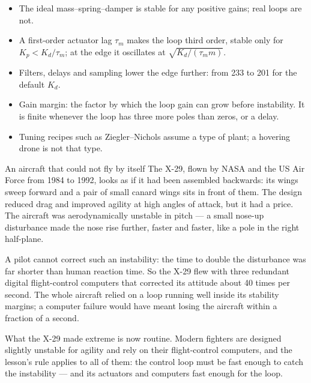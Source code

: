 \begin{remember}
\begin{itemize}
  \item The ideal mass–spring–damper is stable for any positive gains; real loops are not.
  \item A first-order actuator lag $\tau_m$ makes the loop third order, stable only for $K_p < K_d/\tau_m$; at the edge it oscillates at $\sqrt{K_d/(\tau_mm)}$.
  \item Filters, delays and sampling lower the edge further: from 233 to 201 for the default $K_d$.
  \item Gain margin: the factor by which the loop gain can grow before instability. It is finite whenever the loop has three more poles than zeros, or a delay.
  \item Tuning recipes such as Ziegler–Nichols assume a type of plant; a hovering drone is not that type.
\end{itemize}
\end{remember}

\begin{curiosity}{An aircraft that could not fly by itself}
The X-29, flown by NASA and the US Air Force from 1984 to 1992, looks as if it had been assembled backwards: its wings sweep forward and a pair of small canard wings sits in front of them. The design reduced drag and improved agility at high angles of attack, but it had a price. The aircraft was aerodynamically unstable in pitch — a small nose-up disturbance made the nose rise further, faster and faster, like a pole in the right half-plane.

A pilot cannot correct such an instability: the time to double the disturbance was far shorter than human reaction time. So the X-29 flew with three redundant digital flight-control computers that corrected its attitude about 40 times per second. The whole aircraft relied on a loop running well inside its stability margins; a computer failure would have meant losing the aircraft within a fraction of a second.

What the X-29 made extreme is now routine. Modern fighters are designed slightly unstable for agility and rely on their flight-control computers, and the lesson's rule applies to all of them: the control loop must be fast enough to catch the instability — and its actuators and computers fast enough for the loop.
\end{curiosity}


